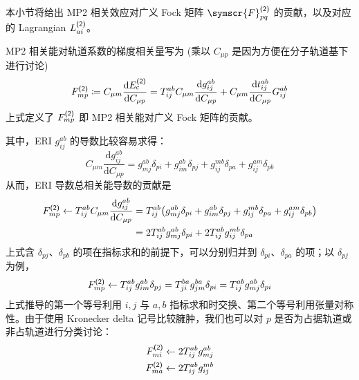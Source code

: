 本小节将给出 MP2 相关效应对广义 Fock 矩阵 $\symscr{F}_{pq}^\textmt{(2)}$ 的贡献，以及对应的 Lagrangian $L_{ai}^{\textsf{(2)}}$。

MP2 相关能对轨道系数的梯度相关量写为 (乘以 $C_{\mu p}$ 是因为方便在分子轨道基下进行讨论)
\begin{equation}
    \label{eq.3.def-fock-cmp2}
    F_{mp}^{\textsf{(2)}} \coloneq C_{\mu m} \frac{\mathrm{d} E_\mathrm{c}^{\textsf{(2)}}}{\mathrm{d} C_{\mu p}} = T_{ij}^{ab} C_{\mu m} \frac{\mathrm{d} g_{ij}^{ab}}{\mathrm{d} C_{\mu p}} + C_{\mu m} \frac{\mathrm{d} t_{ij}^{ab}}{\mathrm{d} C_{\mu p}} G_{ij}^{ab}
\end{equation}
上式定义了 $F_{mp}^{\textsf{(2)}}$ 即 MP2 相关能对广义 Fock 矩阵的贡献。

其中，ERI $g_{ij}^{ab}$ 的导数比较容易求得：
\begin{equation}
    C_{\mu m} \frac{\mathrm{d} g_{ij}^{ab}}{\mathrm{d} C_{\mu p}} = g_{mj}^{ab} \delta_{pi} + g_{im}^{ab} \delta_{pj} + g_{ij}^{mb} \delta_{pa} + g_{ij}^{am} \delta_{pb}
\end{equation}
从而，ERI 导数总相关能导数的贡献是
\begin{align}
    F_{mp}^{\textsf{(2)}} \leftarrow T_{ij}^{ab} C_{\mu m} \frac{\mathrm{d} g_{ij}^{ab}}{\mathrm{d} C_{\mu p}} &= T_{ij}^{ab} \big( g_{mj}^{ab} \delta_{pi} + g_{im}^{ab} \delta_{pj} + g_{ij}^{mb} \delta_{pa} + g_{ij}^{am} \delta_{pb} \big) \notag\\
    &= 2 T_{ij}^{ab} g_{mj}^{ab} \delta_{pi} + 2 T_{ij}^{ab} g_{ij}^{mb} \delta_{pa}
\end{align}
上式含 $\delta_{pj}$、$\delta_{pb}$ 的项在指标求和的前提下，可以分别归并到 $\delta_{pi}$、$\delta_{pa}$ 的项；以 $\delta_{pj}$ 为例，
\begin{align*}
    F_{mp}^{\textsf{(2)}} \leftarrow T_{ij}^{ab} g_{im}^{ab} \delta_{pj} = T_{ji}^{ba} g_{jm}^{ba} \delta_{pi} = T_{ij}^{ab} g_{mj}^{ab} \delta_{pi}
\end{align*}
上式推导的第一个等号利用 $i, j$ 与 $a, b$ 指标求和时交换、第二个等号利用张量对称性。由于使用 Kronecker delta 记号比较臃肿，我们也可以对 $p$ 是否为占据轨道或非占轨道进行分类讨论：
\begin{align}
    \label{eq.3.fock-cmp2-part1-mi}
    F_{mi}^{\textsf{(2)}} &\leftarrow 2 T_{ij}^{ab} g_{mj}^{ab} \\
    \label{eq.3.fock-cmp2-part1-ma}
    F_{ma}^{\textsf{(2)}} &\leftarrow 2 T_{ij}^{ab} g_{ij}^{mb}
\end{align}

